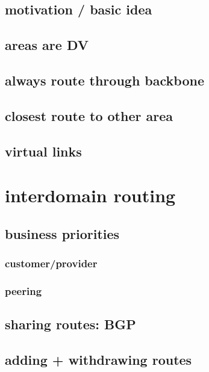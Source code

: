 \subsection{motivation / basic idea}



\subsection{areas are DV}



\subsection{always route through backbone}


\subsection{closest route to other area}

\subsection{virtual links}

\section{interdomain routing}

\subsection{business priorities}

\subsubsection{customer/provider}

\subsubsection{peering}

\subsection{sharing routes: BGP}

\subsection{adding + withdrawing routes}

